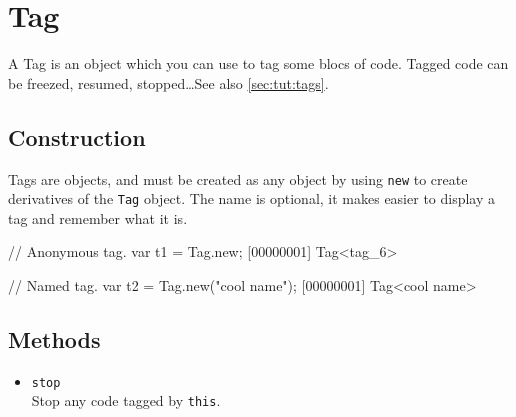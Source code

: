 \section{Tag}

A Tag is an object which you can use to tag some blocs of code.
Tagged code can be freezed, resumed, stopped\ldots See also
\autoref{sec:tut:tags}.

\subsection{Construction}
\label{stdlib:tag:ctor}

Tags are objects, and must be created as any object by using
\lstinline{new} to create derivatives of the \lstinline{Tag} object.
The name is optional, it makes easier to display a tag and remember
what it is.

\begin{urbiscript}
// Anonymous tag.
var t1 = Tag.new;
[00000001] Tag<tag_6>

// Named tag.
var t2 = Tag.new("cool name");
[00000001] Tag<cool name>
\end{urbiscript}


\subsection{Methods}
\begin{itemize}
\item \lstinline|stop|~\\
  Stop any code tagged by \lstinline|this|.
\end{itemize}

